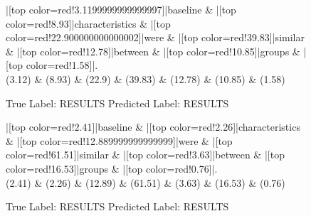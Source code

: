 \documentclass[a4paper, landscape]{article}
\begin{document}
\begin{figure}
\begin{center}
\begin{dependency}
\begin{deptext}
|[top color=red!3.1199999999999997]|baseline \& |[top color=red!8.93]|characteristics \& |[top color=red!22.900000000000002]|were \& |[top color=red!39.83]|similar \& |[top color=red!12.78]|between \& |[top color=red!10.85]|groups \& |[top color=red!1.58]|.\\
(3.12) \& (8.93) \& (22.9) \& (39.83) \& (12.78) \& (10.85) \& (1.58)\\
\end{deptext}
\end{dependency}
\end{center}
\caption{True Label: RESULTS Predicted Label: RESULTS}
\end{figure}
\clearpage
\begin{figure}
\begin{center}
\begin{dependency}
\begin{deptext}
|[top color=red!2.41]|baseline \& |[top color=red!2.26]|characteristics \& |[top color=red!12.889999999999999]|were \& |[top color=red!61.51]|similar \& |[top color=red!3.63]|between \& |[top color=red!16.53]|groups \& |[top color=red!0.76]|.\\
(2.41) \& (2.26) \& (12.89) \& (61.51) \& (3.63) \& (16.53) \& (0.76)\\
\end{deptext}
\end{dependency}
\end{center}
\caption{True Label: RESULTS Predicted Label: RESULTS}
\end{figure}
\clearpage
\end{document}
